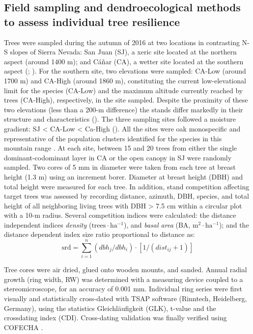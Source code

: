 \subsection{Field sampling and dendroecological methods to assess individual tree resilience}\label{sec:dendro:Field}
Trees were sampled during the autumn of 2016 at two locations in contrasting N-S slopes of Sierra Nevada: San Juan (SJ), a xeric site located at the northern aspect (around 1400 m); and Cáñar (CA), a wetter site located at the southern aspect (; ). For the southern site, two elevations were sampled: CA-Low (around 1700 m) and CA-High (around 1860 m), constituting the current low-elevational limit for the species (CA-Low) and the maximum altitude currently reached by trees (CA-High), respectively, in the site sampled. Despite the proximity of these two elevations (less than a 200-m difference) the stands differ markedly in their structure and characteristics (). The three sampling sites followed a moisture gradient: SJ \textless{} CA-Low \textless{} Ca-High (). All the sites were oak monospecific and representative of the population clusters identified for the species in this mountain range \autocite{PerezLuqueetal2015DatasetMIGRAME}. At each site, between 15 and 20 trees from either the single dominant-codominant layer in CA or the open canopy in SJ were randomly sampled. Two cores of 5 mm in diameter were taken from each tree at breast height (1.3 m) using an increment borer. Diameter at breast height (DBH) and total height were measured for each tree. In addition, stand competition affecting target trees was assessed by recording distance, azimuth, DBH, species, and total height of all neighboring living trees with DBH \textgreater{} 7.5 cm within a circular plot with a 10-m radius. Several competition indices were calculated: the distance independent indices \emph{density} (\(\mathrm{trees \cdot ha^{-1}}\)), and \emph{basal area} (BA, \(\mathrm{m^{2} \cdot ha^{-1}}\)); and the distance dependent index size ratio proportional to distance \autocite[see][ for more details]{GeaIzquierdoCanellas2009AnalysisHolm} as: \[\mathrm{srd} = \sum_{i=1}^{n} (dbh_j / dbh_i) \cdot \left[1/ (dist_{ij} + 1) \right ]\]

Tree cores were air dried, glued onto wooden mounts, and sanded. Annual radial growth (ring width, RW) was determined with a measuring device coupled to a stereomicroscope, for an accuracy of 0.001 mm. Individual ring series were first visually and statistically cross-dated with TSAP software (Rinntech, Heidelberg, Germany), using the statistics Gleichläufigkeit (GLK), t-value and the crossdating index (CDI). Cross-dating validation was finally verified using COFECHA \autocite{Holmes1983ComputerassistedQuality}.

